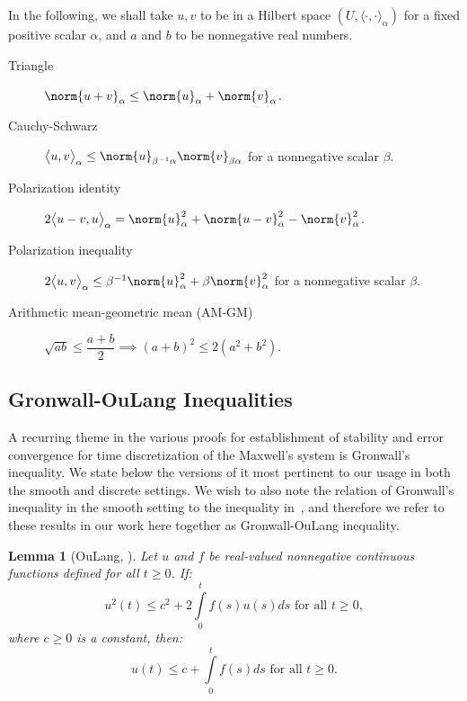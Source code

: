 \documentclass{amsart}
\theoremstyle{thmstyleone}%
\theoremstyle{thmstyletwo}%
\theoremstyle{thmstylethree}%
\newtheorem{lemma}[theorem]{Lemma}
\newcommand{\ainnerproduct}[2]{\langle #1, #2 \rangle}
\newcommand{\aInnerproduct}[2]{\bigl\langle #1, #2 \bigr\rangle}
\begin{document}
In the following, we shall take $u, v$ to be in a Hilbert space $(U, \ainnerproduct{\cdot}{\cdot}_{\alpha})$ for a fixed positive scalar $\alpha$, and $a$ and $b$ to be nonnegative real numbers. 
\begin{description}
\item[Triangle] $\norm{u + v}_{\alpha} \le \norm{u}_{\alpha} + \norm{v}_{\alpha}$.
  
\item[Cauchy-Schwarz] $\aInnerproduct{u}{v}_{\alpha} \le \norm{u}_{\beta^{-1}\alpha} \norm{v}_{\beta \alpha}$ for a nonnegative scalar $\beta$.
  
\item[Polarization identity] $2 \aInnerproduct{u - v}{u}_{\alpha} = \norm{u}_{\alpha}^2 + \norm{u - v}_{\alpha}^2 - \norm{v}_\alpha^2$.

\item[Polarization inequality] $2 \aInnerproduct{u}{v}_{\alpha} \le \beta^{-1} \norm{u}_{\alpha}^2 + \beta \norm{v}_{\alpha}^2$ for a nonnegative scalar $\beta$.

\item[Arithmetic mean-geometric mean (AM-GM)] $\sqrt{a b}\le \dfrac{a + b}{2} \implies \left( a + b \right)^2 \le 2 \left( a^2 + b^2 \right)$.
\end{description}


\subsection{Gronwall-OuLang Inequalities}

A recurring theme in the various proofs for establishment of stability and error convergence for time discretization of the Maxwell's system is Gronwall's inequality. We state below the versions of it most pertinent to our usage in both the smooth and discrete settings. We wish to also note the relation of Gronwall's inequality in the smooth setting to the inequality in~\cite{OuLang1957}, and therefore we refer to these results in our work here together as Gronwall-OuLang inequality.

\begin{lemma}[OuLang, \cite{OuLang1957}] \label{lemma:oulang}
  Let $u$ and $f$ be real-valued nonnegative continuous functions defined for all $t \ge 0$. If:
  \[
    u^2(t) \le c^2 + 2 \int\limits_0^t f(s) u(s) ds \text{ for all } t \ge 0,
  \]
  where $c \ge 0$ is a constant, then:
  \[
    u(t) \le c + \int\limits_0^t f(s) ds \text{ for all } t \ge 0.
  \]
  
\end{lemma}
\end{document}
